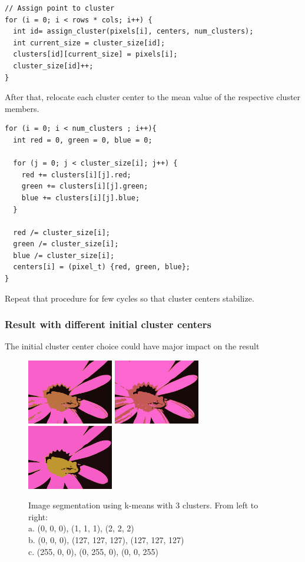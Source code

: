 \documentclass[a4paper, 10pt]{article}
\begin{document}
\begin{lstlisting}[frame=single]
// Assign point to cluster
for (i = 0; i < rows * cols; i++) {
  int id= assign_cluster(pixels[i], centers, num_clusters);
  int current_size = cluster_size[id];
  clusters[id][current_size] = pixels[i];
  cluster_size[id]++;
}
\end{lstlisting}

After that, relocate each cluster center to the mean value of the respective cluster members.
\begin{lstlisting}[frame=single]
for (i = 0; i < num_clusters ; i++){
  int red = 0, green = 0, blue = 0;

  for (j = 0; j < cluster_size[i]; j++) {
    red += clusters[i][j].red;
    green += clusters[i][j].green;
    blue += clusters[i][j].blue;
  }

  red /= cluster_size[i];
  green /= cluster_size[i];
  blue /= cluster_size[i];
  centers[i] = (pixel_t) {red, green, blue};
}
\end{lstlisting}

Repeat that procedure for few cycles so that cluster centers stabilize.

\subsubsection*{Result with different initial cluster centers}
The initial cluster center choice could have major impact on the result
\begin{figure}[!htb]
\centering
\includegraphics[width=142px]{frog_rgb_3_0_out.png}
\includegraphics[width=142px]{frog_rgb_3_gray_out.png}
\includegraphics[width=142px]{frog_rgb_3_pol_out.png}
\caption[caption]{Image segmentation using k-means with 3 clusters. From left to right:\\
a. (0, 0, 0), (1, 1, 1), (2, 2, 2)\\
b. (0, 0, 0), (127, 127, 127), (127, 127, 127)\\
c. (255, 0, 0), (0, 255, 0), (0, 0, 255)}
\end{figure}
\end{document}
